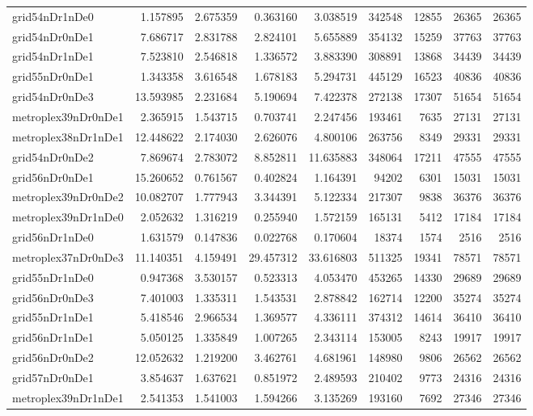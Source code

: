 \begin{longtable}{|l|r|r|r|r|r|r|r|r|}
grid54nDr1nDe0 & 1.157895 & 2.675359 & 0.363160 & 3.038519 & 342548 & 12855 & 26365 & 26365 \\
grid54nDr0nDe1 & 7.686717 & 2.831788 & 2.824101 & 5.655889 & 354132 & 15259 & 37763 & 37763 \\
grid54nDr1nDe1 & 7.523810 & 2.546818 & 1.336572 & 3.883390 & 308891 & 13868 & 34439 & 34439 \\
grid55nDr0nDe1 & 1.343358 & 3.616548 & 1.678183 & 5.294731 & 445129 & 16523 & 40836 & 40836 \\
grid54nDr0nDe3 & 13.593985 & 2.231684 & 5.190694 & 7.422378 & 272138 & 17307 & 51654 & 51654 \\
metroplex39nDr0nDe1 & 2.365915 & 1.543715 & 0.703741 & 2.247456 & 193461 & 7635 & 27131 & 27131 \\
metroplex38nDr1nDe1 & 12.448622 & 2.174030 & 2.626076 & 4.800106 & 263756 & 8349 & 29331 & 29331 \\
grid54nDr0nDe2 & 7.869674 & 2.783072 & 8.852811 & 11.635883 & 348064 & 17211 & 47555 & 47555 \\
grid56nDr0nDe1 & 15.260652 & 0.761567 & 0.402824 & 1.164391 & 94202 & 6301 & 15031 & 15031 \\
metroplex39nDr0nDe2 & 10.082707 & 1.777943 & 3.344391 & 5.122334 & 217307 & 9838 & 36376 & 36376 \\
metroplex39nDr1nDe0 & 2.052632 & 1.316219 & 0.255940 & 1.572159 & 165131 & 5412 & 17184 & 17184 \\
grid56nDr1nDe0 & 1.631579 & 0.147836 & 0.022768 & 0.170604 & 18374 & 1574 & 2516 & 2516 \\
metroplex37nDr0nDe3 & 11.140351 & 4.159491 & 29.457312 & 33.616803 & 511325 & 19341 & 78571 & 78571 \\
grid55nDr1nDe0 & 0.947368 & 3.530157 & 0.523313 & 4.053470 & 453265 & 14330 & 29689 & 29689 \\
grid56nDr0nDe3 & 7.401003 & 1.335311 & 1.543531 & 2.878842 & 162714 & 12200 & 35274 & 35274 \\
grid55nDr1nDe1 & 5.418546 & 2.966534 & 1.369577 & 4.336111 & 374312 & 14614 & 36410 & 36410 \\
grid56nDr1nDe1 & 5.050125 & 1.335849 & 1.007265 & 2.343114 & 153005 & 8243 & 19917 & 19917 \\
grid56nDr0nDe2 & 12.052632 & 1.219200 & 3.462761 & 4.681961 & 148980 & 9806 & 26562 & 26562 \\
grid57nDr0nDe1 & 3.854637 & 1.637621 & 0.851972 & 2.489593 & 210402 & 9773 & 24316 & 24316 \\
metroplex39nDr1nDe1 & 2.541353 & 1.541003 & 1.594266 & 3.135269 & 193160 & 7692 & 27346 & 27346 \\

\end{longtable}

